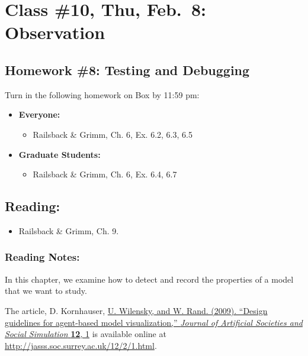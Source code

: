 \documentclass[]{article}
\providecommand{\tightlist}{%
  \setlength{\itemsep}{0pt}\setlength{\parskip}{0pt}}
\begin{document}
\hypertarget{class-10-thu-feb.8-observation}{%
\section{Class \#10, Thu, Feb.~8:
Observation}\label{class-10-thu-feb.8-observation}}

\hypertarget{homework-8-testing-and-debugging}{%
\subsection{Homework \#8: Testing and
Debugging}\label{homework-8-testing-and-debugging}}

Turn in the following homework on Box by 11:59 pm:

\begin{itemize}
\tightlist
\item
  \textbf{Everyone:}

  \begin{itemize}
  \tightlist
  \item
    Railsback \& Grimm, Ch. 6, Ex. 6.2, 6.3, 6.5
  \end{itemize}
\item
  \textbf{Graduate Students:}

  \begin{itemize}
  \tightlist
  \item
    Railsback \& Grimm, Ch. 6, Ex. 6.4, 6.7
  \end{itemize}
\end{itemize}

\hypertarget{reading-9}{%
\subsection{Reading:}\label{reading-9}}

\begin{itemize}
\tightlist
\item
  Railsback \& Grimm, Ch. 9.
\end{itemize}

\hypertarget{reading-notes-8}{%
\subsubsection{Reading Notes:}\label{reading-notes-8}}

In this chapter, we examine how to detect and record the properties of a
model that we want to study.

The article, D. Kornhauser,
\href{http://jasss.soc.surrey.ac.uk/12/2/1.html}{U. Wilensky, and W.
Rand. (2009). ``Design guidelines for agent-based model visualization,''
\emph{Journal of Artificial Societies and Social Simulation}
\textbf{12}, 1} is available online at
\url{http://jasss.soc.surrey.ac.uk/12/2/1.html}.
\end{document}
